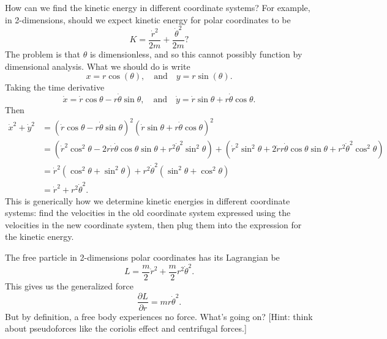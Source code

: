 How can we find the kinetic energy in different coordinate systems? For
example, in 2-dimensions, should we expect kinetic energy for polar
coordinates to be
\begin{equation}
K = \frac{\dot{r}^{2}}{2m} + \frac{\dot{\theta}^{2}}{2m}?
\end{equation}
The problem is that $\theta$ is dimensionless, and so this cannot
possibly function by dimensional analysis. What we should do is write
\begin{equation}
x = r\cos(\theta),\quad\mbox{and}\quad y=r\sin(\theta).
\end{equation}
Taking the time derivative
\begin{equation}
  \dot{x} = \dot{r}\cos\theta -r\dot\theta\sin\theta,\quad\mbox{and}\quad
  \dot{y} = \dot{r}\sin\theta +r\dot\theta\cos\theta.
\end{equation}
Then
\begin{subequations}
\begin{align}
\dot{x}^{2}+\dot{y}^{2} &= \left(\dot{r}\cos\theta -r\dot\theta\sin\theta\right)^{2}
\left(\dot{r}\sin\theta +r\dot\theta\cos\theta\right)^2\\
&= \left(\dot{r}^{2}\cos^{2}\theta
-2r\dot{r}\dot\theta\cos\theta\sin\theta
+r^{2}\dot\theta^{2}\sin^{2}\theta\right)
+ \left(\dot{r}^2\sin^2\theta + 2\dot{r}r\dot\theta\cos\theta\sin\theta +r^2\dot\theta^2\cos^2\theta\right)\\
&=\dot{r}^{2}(\cos^{2}\theta + \sin^2\theta) + r^2\dot\theta^2(\sin^2\theta + \cos^2\theta)\\
&=\dot{r}^{2} + r^2\dot\theta^2.
\end{align}
\end{subequations}
This is generically how we determine kinetic energies in different
coordinate systems: find the velocities in the old coordinate system
expressed using the velocities in the new coordinate system, then plug
them into the expression for the kinetic energy.

The free particle in 2-dimensions polar coordinates has its Lagrangian
be
\begin{equation}
L = \frac{m}{2}\dot{r}^{2} + \frac{m}{2}r^2\dot\theta^2.
\end{equation}
This gives us the generalized force
\begin{equation}
\frac{\partial L}{\partial r} = mr\dot\theta^{2}.
\end{equation}
But by definition, a free body experiences no force. What's going on?
[Hint: think about pseudoforces like the coriolis effect and centrifugal forces.]